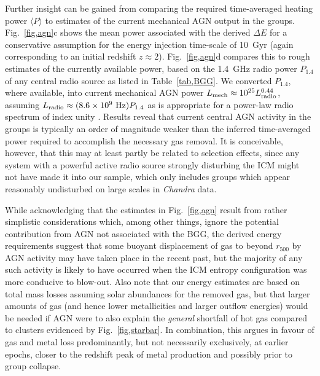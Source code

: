 \documentclass[useAMS,usenatbib]{mn2e}
\begin{document}
Further insight can be gained from comparing the required
time-averaged heating power $\langle P\rangle$ to estimates of the
current mechanical AGN output in the groups. Fig.~\ref{fig,agn}c shows
the mean power associated with the derived $\Delta E$ for a
conservative assumption for the energy injection time-scale of 10~Gyr
(again corresponding to an initial redshift $z\approx 2$).
Fig.~\ref{fig,agn}d compares this to rough estimates of the currently
available power, based on the 1.4~GHz radio power $P_{1.4}$ of any
central radio source as listed in Table~\ref{tab,BGG}. We converted
$P_{1.4}$, where available, into current mechanical AGN power $L_{\rm
mech} \approx 10^{25} L_{\rm radio}^{0.44}$, assuming $L_{\rm radio}
\approx (8.6\times 10^{9}\mbox{ Hz}) P_{1.4}$ as is appropriate for a
power-law radio spectrum of index unity \citep{birz04}. Results reveal
that current central AGN activity in the groups is typically an order
of magnitude weaker than the inferred time-averaged power required to
accomplish the necessary gas removal. It is conceivable, however, that
this may at least partly be related to selection effects, since any
system with a powerful active radio source strongly disturbing the ICM
might not have made it into our sample, which only includes groups
which appear reasonably undisturbed on large scales in {\em Chandra}
data.

While acknowledging that the estimates in Fig.~\ref{fig,agn} result
from rather simplistic considerations which, among other things,
ignore the potential contribution from AGN not associated with the
BGG, the derived energy requirements suggest that some buoyant
displacement of gas to beyond $r_{500}$ by AGN activity may have taken
place in the recent past, but the majority of any such activity is
likely to have occurred when the ICM entropy configuration was more
conducive to blow-out. Also note that our energy estimates are based
on total mass losses assuming solar abundances for the removed gas,
but that larger amounts of gas (and hence lower metallicities and
larger outflow energies) would be needed if AGN were to also explain
the {\em general} shortfall of hot gas compared to clusters evidenced
by Fig.~\ref{fig,starbar}. In combination, this argues in favour of
gas and metal loss predominantly, but not necessarily exclusively, at
earlier epochs, closer to the redshift peak of metal production and
possibly prior to group collapse.
\end{document}
